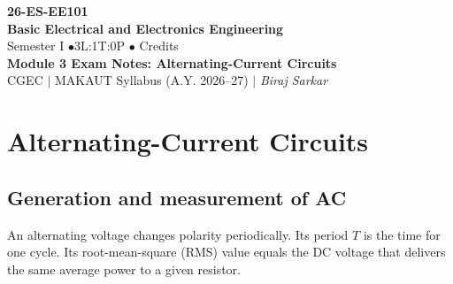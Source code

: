\documentclass[12pt,a4paper]{article}
\begin{document}
\begin{center}
  {\Large\bfseries\color{myred} 26-ES-EE101}\\[3pt]
  {\LARGE\bfseries\color{myred} Basic Electrical and Electronics Engineering}\\[5pt]
  {\normalsize\color{mydark} Semester I \quad$\bullet$\quad 3L:1T:0P \quad$\bullet$ Credits}\\[3pt]
  {\normalsize\color{myteal}\textbf{Module 3 Exam Notes: Alternating-Current Circuits}}\\[3pt]
  {\small\color{mydark} CGEC \;$|$\; MAKAUT Syllabus (A.Y. 2026--27) \;$|$\; \textit{Biraj Sarkar}}
\end{center}
\vspace{2pt}
\noindent{\color{myred}\rule{\linewidth}{1.5pt}}
\vspace{2pt}

\hypersetup{linkcolor=mydark}
\tableofcontents
\hypersetup{linkcolor=myteal}
\newpage

\section{Alternating-Current Circuits}

\subsection{Generation and measurement of AC}
\begin{tcolorbox}[defbox,title={Alternating voltage, period and RMS value}]
An alternating voltage changes polarity periodically. Its period \(T\) is the time for one cycle. Its root-mean-square (RMS) value equals the DC voltage that delivers the same average power to a given resistor.
\end{tcolorbox}
\end{document}
